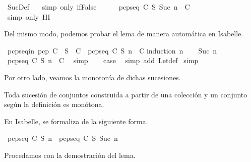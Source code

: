 \begin{isabellebody}
\ SucDef\ {}\ \isamarkupfalse%
\ {\isacharparenleft}simp\ only{\isacharcolon}\ if{\isacharunderscore}False{\isacharparenright}\isanewline
\ \ \ \ \isamarkupfalse%
\ {\isachardoublequoteopen}pcp{\isacharunderscore}seq\ C\ S\ {\isacharparenleft}Suc\ n{\isacharparenright}\ {\isasymin}\ C{\isachardoublequoteclose}\isanewline
\ \ \ \ \ \ \isamarkupfalse%
\ {\isacharparenleft}simp\ only{\isacharcolon}\ HI{\isacharparenright}\isanewline
\ \ \isamarkupfalse%
\isanewline
{}\isamarkupfalse%
%
\endisatagproof
{\isafoldproof}%
%
\isadelimproof
%
\endisadelimproof
%
\begin{isamarkuptext}%
Del mismo modo, podemos probar el lema de manera automática en Isabelle.%
\end{isamarkuptext}\isamarkuptrue%
\isamarkupfalse%
\ pcp{\isacharunderscore}seq{\isacharunderscore}in{\isacharcolon}\ {\isachardoublequoteopen}pcp\ C\ {\isasymLongrightarrow}\ S\ {\isasymin}\ C\ {\isasymLongrightarrow}\ pcp{\isacharunderscore}seq\ C\ S\ n\ {\isasymin}\ C{\isachardoublequoteclose}\isanewline
%
\isadelimproof
%
\endisadelimproof
%
\isatagproof
{}\isamarkupfalse%
{\isacharparenleft}induction\ n{\isacharparenright}\isanewline
\ \ \isamarkupfalse%
\ {\isacharparenleft}Suc\ n{\isacharparenright}\ \ \isanewline
\ \ \isamarkupfalse%
\ {\isachardoublequoteopen}pcp{\isacharunderscore}seq\ C\ S\ n\ {\isasymin}\ C{\isachardoublequoteclose}\ \isamarkupfalse%
\ simp\isanewline
\ \ \isamarkupfalse%
\ {\isacharquery}case\ \isamarkupfalse%
\ {\isacharparenleft}simp\ add{\isacharcolon}\ Let{\isacharunderscore}def{\isacharparenright}\isanewline
{}\isamarkupfalse%
\ simp%
\endisatagproof
{\isafoldproof}%
%
\isadelimproof
%
\endisadelimproof
%
\begin{isamarkuptext}%
Por otro lado, veamos la monotonía de dichas sucesiones.

  \begin{lema}
    Toda sucesión de conjuntos construida a partir de una colección y un conjunto según la
    definición  es monótona.
  \end{lema}

  En Isabelle, se formaliza de la siguiente forma.%
\end{isamarkuptext}\isamarkuptrue%
\isamarkupfalse%
\ {\isachardoublequoteopen}pcp{\isacharunderscore}seq\ C\ S\ n\ {\isasymsubseteq}\ pcp{\isacharunderscore}seq\ C\ S\ {\isacharparenleft}Suc\ n{\isacharparenright}{\isachardoublequoteclose}\isanewline
%
\isadelimproof
\ \ %
\endisadelimproof
%
\isatagproof
{}\isamarkupfalse%
%
\endisatagproof
{\isafoldproof}%
%
\isadelimproof
%
\endisadelimproof
%
\begin{isamarkuptext}%
Procedamos con la demostración del lema.


\end{isamarkuptext}
\end{isabellebody}
